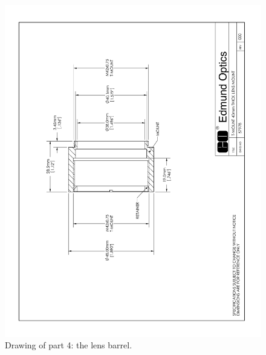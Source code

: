 \begin{figure}
\begin{center}
\includegraphics[angle=0,width=0.9\linewidth]{figures/huitzi-f20-part-4.pdf}
\end{center}
\caption{Drawing of part 4: the lens barrel.}
\label{figure:huitzi-f20-part-4}
\end{figure}

